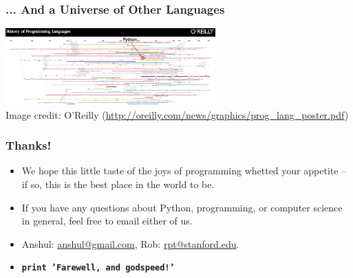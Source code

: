 \documentclass[10pt]{beamer}
\begin{document}
\begin{frame}
  \frametitle{... And a Universe of Other Languages}
  \begin{center}
    \includegraphics[width=305px]{ProgrammingLanguagesPoster-AnnotatedCropped.png} \\
    \tiny 
    Image credit: O'Reilly (\href{http://oreilly.com/news/graphics/prog\_lang\_poster.pdf}{http://oreilly.com/news/graphics/prog\_lang\_poster.pdf})
  \end{center}
\end{frame}

\begin{frame}
  \frametitle{Thanks!}
  \begin{itemize}
    \item We hope this little taste of the joys of programming whetted your appetite -- if so, this is the best place in the world to be.
    \item If you have any questions about Python, programming, or computer science in general, feel free to email either of us.
    \item Anshul: \href{mailto:anshul@gmail.com}{anshul@gmail.com}, Rob: \href{mailto:rpt@stanford.edu}{rpt@stanford.edu}.
    \item \texttt{\textbf{print 'Farewell, and godspeed!'}}
  \end{itemize}
\end{frame}
\end{document}
